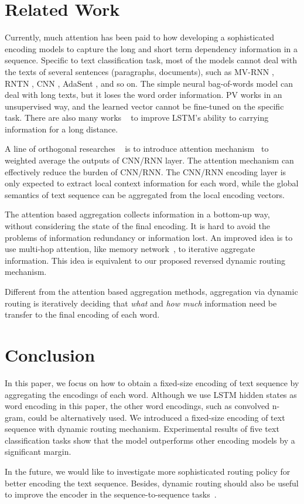\documentclass[11pt]{article}
\begin{document}
\section{Related Work}

Currently, much attention has been paid to how developing a sophisticated encoding models to capture the long and short term dependency information in a sequence. Specific to text classification task, most of the models cannot deal with the texts of several sentences (paragraphs, documents), such as MV-RNN \cite{socher2012semantic}, RNTN \cite{socher2013recursive}, CNN \cite{kim2014convolutional}, AdaSent \cite{zhao2015self}, and so on. The simple neural bag-of-words model can deal with long texts, but it loses the word order information. PV \cite{le2014distributed} works in an unsupervised way, and the learned vector cannot be fine-tuned on the specific task. There are also many works ~\cite{DBLP:conf/emnlp/LiuQCWH15,DBLP:journals/corr/XuCQH16,DBLP:conf/emnlp/0001DL16} to improve LSTM's ability to carrying information for a long distance.

A line of orthogonal researches ~\cite{lin2017structured,yang2016hierarchical,Shen2018DISAN,shen2018bi}
is to introduce attention mechanism~\cite{DBLP:conf/nips/VaswaniSPUJGKP17} to weighted average the outputs of CNN/RNN layer. The attention mechanism  can effectively reduce the burden of CNN/RNN. The CNN/RNN encoding layer is only expected to extract local context information for each word, while the global semantics of text sequence can be aggregated from the local encoding vectors.

The attention based aggregation collects information in a bottom-up way, without considering the state of the final encoding. It is hard to avoid the problems of information redundancy or information lost.
An improved idea is to use multi-hop attention, like memory network~\cite{sukhbaatar2015end,kumar2015ask}, to iterative aggregate information. This idea is equivalent to our proposed reversed dynamic routing mechanism.

Different from the attention based aggregation methods, aggregation via dynamic routing is iteratively deciding that \textit{what} and \textit{how much} information need be transfer to the final encoding of each word.




\section{Conclusion}
In this paper, we focus on how to obtain a fixed-size encoding of text sequence by aggregating the encodings of each word. Although we use LSTM hidden states as word encoding in this paper, the other word encodings, such as convolved n-gram, could be alternatively used. We introduced a fixed-size encoding of text sequence with dynamic routing mechanism. Experimental results of five text classification tasks show that the model outperforms other encoding models by a significant margin.

In the future, we would like to investigate more sophisticated routing policy for better encoding the text sequence. Besides, dynamic routing should also be useful to improve the encoder in the sequence-to-sequence tasks~\cite{sutskever2014sequence}.






\end{document}
